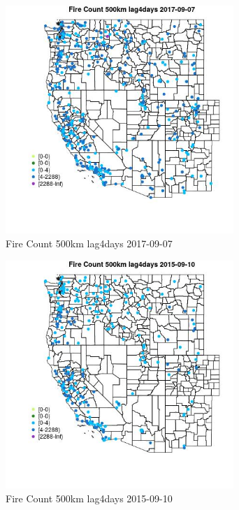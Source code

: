 \begin{figure} 
\centering  
\includegraphics[width=0.77\textwidth]{Code_Outputs/Report_ML_input_PM25_Step4_part_e_de_duplicated_aves_compiled_2019-05-20wNAs_MapObsFire_Count_500km_lag4days2017-09-07.jpg} 
\caption{\label{fig:Report_ML_input_PM25_Step4_part_e_de_duplicated_aves_compiled_2019-05-20wNAsMapObsFire_Count_500km_lag4days2017-09-07}Fire Count 500km lag4days 2017-09-07} 
\end{figure} 
 

\begin{figure} 
\centering  
\includegraphics[width=0.77\textwidth]{Code_Outputs/Report_ML_input_PM25_Step4_part_e_de_duplicated_aves_compiled_2019-05-20wNAs_MapObsFire_Count_500km_lag4days2015-09-10.jpg} 
\caption{\label{fig:Report_ML_input_PM25_Step4_part_e_de_duplicated_aves_compiled_2019-05-20wNAsMapObsFire_Count_500km_lag4days2015-09-10}Fire Count 500km lag4days 2015-09-10} 
\end{figure} 
 


